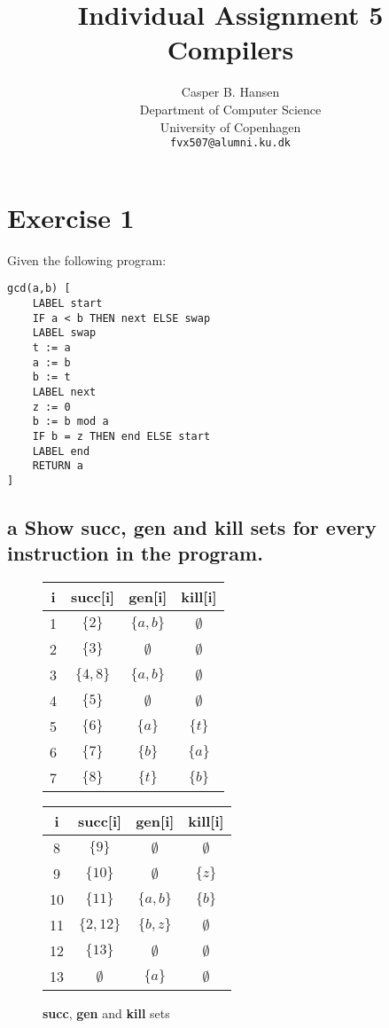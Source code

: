 \documentclass[11pt,a4paper]{article}
\title
{
	\vspace{-1in}
	{\large Individual Assignment 5}\\
	Compilers
}
\author
{
	Casper B. Hansen\\
	Department of Computer Science\\
	University of Copenhagen\\
	{\tt fvx507@alumni.ku.dk}
}
\begin{document}
\clearpage
\maketitle

\section{Exercise 1}
Given the following program:
\begin{lstlisting}
gcd(a,b) [
	LABEL start
	IF a < b THEN next ELSE swap
	LABEL swap
	t := a
	a := b
	b := t
	LABEL next
	z := 0
	b := b mod a
	IF b = z THEN end ELSE start
	LABEL end
	RETURN a
]
\end{lstlisting}

\subsection*{a \mdseries Show {\bf succ}, {\bf gen} and {\bf kill} sets for
every instruction in the program.}
\begin{figure}[H]
	\center

	\begin{multicols}{2}

	\begin{tabular}{|c|c|c|c|}
		\hline
		{\bf i}	& {\bf succ[i]}	& {\bf gen[i]}	& {\bf kill[i]} \\ \hline
		1	& $\{2\}$		& $\{a,b\}$		& $\emptyset$	\\ \hline
		2	& $\{3\}$		& $\emptyset$	& $\emptyset$	\\ \hline
		3	& $\{4,8\}$		& $\{a,b\}$		& $\emptyset$	\\ \hline
		4	& $\{5\}$		& $\emptyset$	& $\emptyset$	\\ \hline
		5	& $\{6\}$		& $\{a\}$		& $\{t\}$ 		\\ \hline
		6	& $\{7\}$		& $\{b\}$		& $\{a\}$		\\ \hline
		7	& $\{8\}$		& $\{t\}$		& $\{b\}$		\\ \hline
	\end{tabular}

	\vfill
	\columnbreak

	\begin{tabular}{|c|c|c|c|}
		\hline
		{\bf i}	& {\bf succ[i]}	& {\bf gen[i]}	& {\bf kill[i]} \\ \hline
		8	& $\{9\}$		& $\emptyset$	& $\emptyset$	\\ \hline
		9	& $\{10\}$		& $\emptyset$	& $\{z\}$		\\ \hline
		10	& $\{11\}$		& $\{a,b\}$		& $\{b\}$		\\ \hline
		11	& $\{2,12\}$	& $\{b,z\}$		& $\emptyset$	\\ \hline
		12	& $\{13\}$		& $\emptyset$	& $\emptyset$	\\ \hline
		13	& $\emptyset$	& $\{a\}$		& $\emptyset$	\\ \hline
	\end{tabular}

	\end{multicols}

	\label{fig:sets}
	\caption{{\bf succ}, {\bf gen} and {\bf kill} sets}

\end{figure}
\end{document}
